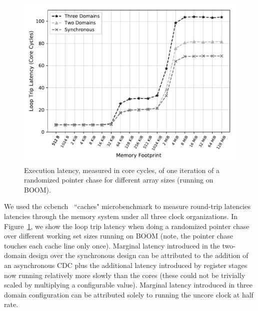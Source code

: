 \begin{figure}[htb]
    \centering
    \includegraphics[width=\columnwidth]{figures/boom-ccbench.pdf}
    \caption{Execution latency, measured in core cycles, of one iteration of a randomized pointer chase
    for different array sizes (running on BOOM).
    }
    \label{fig:boom-ccbench}
\end{figure}

We used the ccbench~\cite{ccbench} ``caches" microbenchmark to measure round-trip latencies latencies
through the memory system under all three clock organizations. In
Figure~\ref{fig:boom-ccbench}, we show the loop trip latency when doing a
randomized pointer chase over different working set sizes running on BOOM (note, the pointer
chase touches each cache line only once). Marginal latency introduced in the
two-domain design over the synchronous design can be attributed to the addition of an asynchronous CDC
plus the additional latency introduced by register stages now running relatively
more slowly than the cores (these could not be trivially scaled by multiplying
a configurable value). Marginal latency introduced in three domain
configuration can be attributed solely to running the uncore clock at half rate.

